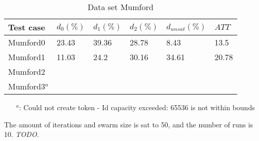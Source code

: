 \begin{table}[H]
    \centering
    \hspace*{-1.0cm}
    \begin{tabular}{|l|l|l|l|l|l|}
        \hline
        Test case &  $d_0(\%)$ & $d_1(\%)$ & $d_2(\%)$ & $d_{unsat}(\%)$ & $ATT$\\
        \hline
        Mumford0 & 23.43 & 39.36 & 28.78 & 8.43 & 13.5\\
        Mumford1 & 11.03 & 24.2 & 30.16 & 34.61 & 20.78\\
        Mumford2 & &  & & &\\
        Mumford3$^a$  & & & &&\\
        \hline
    \end{tabular}
    \caption{Data set Mumford}
    \begin{itemize}[noitemsep]
    \item[$^a$:] Could not create token - Id capacity exceeded: 65536 is not within bounds
    \end{itemize}
    \label{table:dataSet_mumford}
\end{table}
The amount of iterations and swarm size is sat to 50, and the number of runs is 10. \emph{\color{blue} TODO.}